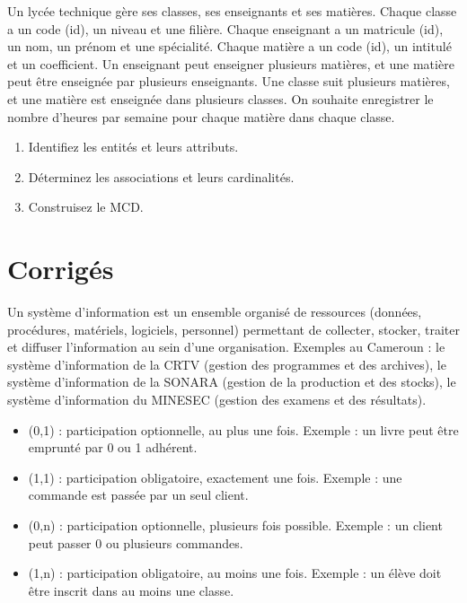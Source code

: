 \exo{}
Un lycée technique gère ses classes, ses enseignants et ses matières. Chaque classe a un code (id), un niveau et une filière. Chaque enseignant a un matricule (id), un nom, un prénom et une spécialité. Chaque matière a un code (id), un intitulé et un coefficient. Un enseignant peut enseigner plusieurs matières, et une matière peut être enseignée par plusieurs enseignants. Une classe suit plusieurs matières, et une matière est enseignée dans plusieurs classes. On souhaite enregistrer le nombre d'heures par semaine pour chaque matière dans chaque classe.
\begin{enumerate}
    \item Identifiez les entités et leurs attributs.
    \item Déterminez les associations et leurs cardinalités.
    \item Construisez le MCD.
\end{enumerate}

\section{Corrigés}

Un système d'information est un ensemble organisé de ressources (données, procédures, matériels, logiciels, personnel) permettant de collecter, stocker, traiter et diffuser l'information au sein d'une organisation. Exemples au Cameroun : le système d'information de la CRTV (gestion des programmes et des archives), le système d'information de la SONARA (gestion de la production et des stocks), le système d'information du MINESEC (gestion des examens et des résultats).

\begin{itemize}
    \item (0,1) : participation optionnelle, au plus une fois. Exemple : un livre peut être emprunté par 0 ou 1 adhérent.
    \item (1,1) : participation obligatoire, exactement une fois. Exemple : une commande est passée par un seul client.
    \item (0,n) : participation optionnelle, plusieurs fois possible. Exemple : un client peut passer 0 ou plusieurs commandes.
    \item (1,n) : participation obligatoire, au moins une fois. Exemple : un élève doit être inscrit dans au moins une classe.
\end{itemize}

